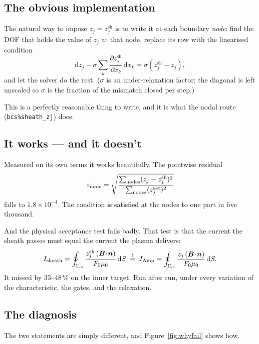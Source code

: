 \documentclass[11pt,a4paper]{article}
\newcommand{\zj}{z_j}
\newcommand{\zjsat}{z^{\mathrm{sat}}_{j}}
\newcommand{\zjsh}{z^{\mathrm{sh}}_{j}}
\newcommand{\dd}{\mathrm{d}}
\newcommand{\Gam}{\Gamma_{\!\mathrm{sh}}}
\newcommand{\code}[1]{\texttt{\small #1}}
\begin{document}
\subsection{The obvious implementation}

The natural way to impose $\zj=\zjsh$ is to write it at each boundary \emph{node}: find the DOF that
holds the value of $\zj$ at that node, replace its row with the linearised condition
\begin{equation}
  \dd \zj - \sigma \sum_k \frac{\partial \zjsh}{\partial x_k}\,\dd x_k = \sigma\left(\zjsh - \zj\right),
\end{equation}
and let the solver do the rest. ($\sigma$ is an under-relaxation factor; the diagonal is left
unscaled so $\sigma$ is the fraction of the mismatch closed per step.)

This is a perfectly reasonable thing to write, and it is what the nodal route (\code{bcs\%sheath\_zj})
does.

\subsection{It works --- and it doesn't}

Measured on its own terms it works beautifully. The pointwise residual
\begin{equation}
  \varepsilon_{\rm node}
  = \sqrt{\frac{\sum_{\rm nodes}(\zj-\zjsh)^2}{\sum_{\rm nodes}(\zjsat)^2}}
\end{equation}
falls to $1.8\times10^{-4}$. The condition is satisfied at the nodes to one part in five thousand.

And the physical acceptance test fails badly. That test is that the current the sheath passes must
equal the current the plasma delivers:
\begin{equation}
  I_{\rm sheath} = \oint_{\Gam} \frac{\zjsh\,(\bm{B}\!\cdot\!\bm{n})}{F_0\mu_0}\,\dd S
  \;\stackrel{!}{=}\;
  I_{\rm Amp} = \oint_{\Gam} \frac{\zj\,(\bm{B}\!\cdot\!\bm{n})}{F_0\mu_0}\,\dd S .
  \label{eq:closure}
\end{equation}
It missed by $33$--$48\,\%$ on the inner target. Run after run, under every variation of the
characteristic, the gates, and the relaxation.

\subsection{The diagnosis}

The two statements are simply different, and Figure~\ref{fig:whyfail} shows how.
\end{document}
